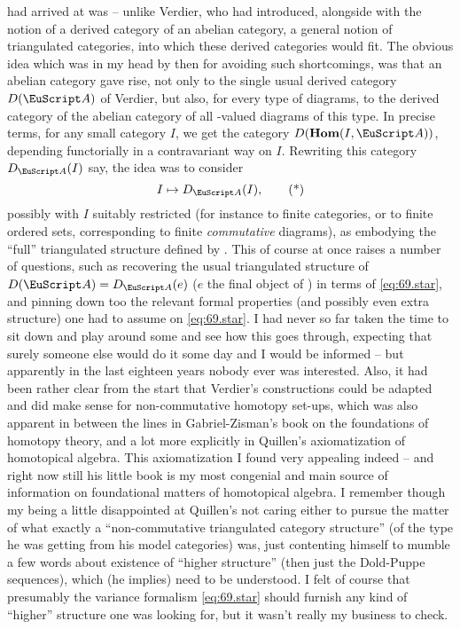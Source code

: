 had arrived at was -- unlike Verdier, who had introduced, alongside
with the notion of a derived category of an abelian category, a
general notion of triangulated categories, into which these derived
categories would fit. The obvious idea which was in my head by then
for avoiding such shortcomings, was that an abelian category \scrA{}
gave rise, not only to the single usual derived category $D(\scrA)$ of
Verdier, but also, for every type of diagrams, to the
derived category of the abelian category of all \scrA-valued diagrams
of this type. In precise terms, for any small category $I$, we get the
category $D(\bHom(I,\scrA))$, depending functorially in a
contravariant way on $I$. Rewriting this category $D_\scrA(I)$ say,
the idea was to consider
\begin{equation}
  \label{eq:69.star}
  I\mapsto D_\scrA(I),\tag{*}
\end{equation}
possibly with $I$ suitably restricted (for instance to finite
categories, or to finite ordered sets, corresponding to finite
\emph{commutative} diagrams), as embodying the ``full'' triangulated
structure defined by \scrA. This of course at once raises a number of
questions, such as recovering the usual triangulated structure of
$D(\scrA)=D_\scrA(e)$ ($e$ the final object of \Cat) in terms of
\eqref{eq:69.star}, and pinning down too the relevant formal
properties (and possibly even extra structure) one had to assume on
\eqref{eq:69.star}. I had never so far taken the time to sit down and
play around some and see how this goes through, expecting that surely
someone else would do it some day and I would be informed -- but
apparently in the last eighteen years nobody ever was
interested. Also, it had been rather clear from the start that
Verdier's constructions could be adapted and did make sense for
non-commutative homotopy set-ups, which was also apparent in between
the lines in Gabriel-Zisman's
book on the foundations of homotopy theory, and a lot more explicitly
in Quillen's axiomatization of homotopical algebra. This
axiomatization I found very appealing indeed -- and right now still
his little book is my most congenial
and main source of information on foundational matters of homotopical
algebra. I remember though my being a little disappointed at Quillen's
not caring either to pursue the matter of what exactly a
``non-commutative triangulated category structure'' (of the type he
was getting from his model categories) was, just contenting himself to
mumble a few words about existence of ``higher structure'' (then just
the Dold-Puppe sequences), which (he implies) need to be understood. I
felt of course that presumably the variance formalism
\eqref{eq:69.star} should furnish any kind of ``higher'' structure one
was looking for, but it wasn't really my business to check.

